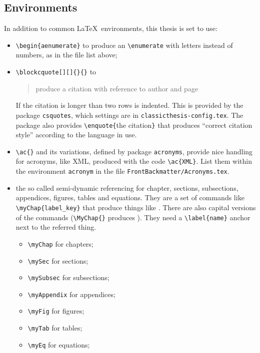 \subsection{Environments}
In addition to common \LaTeX\ environments, this thesis is set to use:
\begin{itemize}


	\item \verb!\begin{aenumerate}! to produce an \verb!\enumerate! with letters instead of numbers, as in the file list above;

	\item \verb!\blockcquote[][]{}{}! to 	\blockcquote[see][p. 111]{bringhurst:2002}{produce a citation
	with reference to author and page}. If the citation is longer than two rows is indented.
This is provided by the package \verb!csquotes!, which settings are in	\verb!classicthesis-config.tex!.
The package also provides \verb!\enquote{!the citation\verb!}! that produces \enquote{correct citation style} according to the language in use.

	\item \verb!\ac{}! and its variations, defined by package \verb!acronyms!, provide nice handling for acronyms, like \ac{XML}, produced with the code \verb!\ac{XML}!.
List them within the environment \verb!acronym! in the file \verb!FrontBackmatter/Acronyms.tex!.

	\item the so called semi-dynamic referencing for chapter, sections, subsections, appendices, figures, tables and equations. They are a set of commands like \verb!\myChap{label_key}! that produce things like . There are also capital versions of the commands (\verb!\MyChap{}! produces ). They need a \verb!\label{name}! anchor next to the referred thing.
	\begin{itemize}
		\item\verb!\myChap! for chapters;
		\item\verb!\mySec! for sections;
		\item\verb!\mySubsec! for subsections;
		\item\verb!\myAppendix! for appendices;
		\item\verb!\myFig! for figures;
		\item\verb!\myTab! for tables;
		\item\verb!\myEq! for equations;
	\end{itemize}


\end{itemize}
